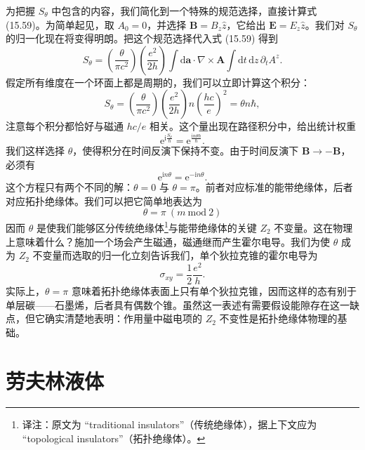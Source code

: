为把握 $S_{\theta}$ 中包含的内容，我们简化到一个特殊的规范选择，直接计算式 (15.59)。为简单起见，取 $A_{0}=0$，并选择 $\mathbf{B}=B_{z}\widehat{z}$，它给出 $\mathbf{E}=E_{z}\widehat{z}$。我们对 $S_{\theta}$ 的归一化现在将变得明朗。把这个规范选择代入式 (15.59) 得到
\begin{equation*}
S_{\theta}=\left(\frac{\theta}{\pi c^{2}}\right)\left(\frac{e^{2}}{2h}\right)\int\mathrm{d}\mathbf{a}\cdot\nabla\times\mathbf{A}\int\mathrm{d}t\,\mathrm{d}z\,\partial_{t}A^{z}.\tag{15.77}
\end{equation*}
假定所有维度在一个环面上都是周期的，我们可以立即计算这个积分：
\begin{equation*}
S_{\theta}=\left(\frac{\theta}{\pi c^{2}}\right)\left(\frac{e^{2}}{2h}\right)n\left(\frac{hc}{e}\right)^{2}=\theta n\hbar,\tag{15.78}
\end{equation*}
注意每个积分都恰好与磁通 $hc/e$ 相关。这个量出现在路径积分中，给出统计权重
\begin{equation*}
\mathrm{e}^{\mathrm{i}\frac{S_{\theta}}{\hbar}}=\mathrm{e}^{\frac{\mathrm{i}n\theta\hbar}{\hbar}}.\tag{15.79}
\end{equation*}
我们这样选择 $\theta$，使得积分在时间反演下保持不变。由于时间反演下 $\mathbf{B}\rightarrow-\mathbf{B}$，必须有
\begin{equation*}
\mathrm{e}^{\mathrm{i}n\theta}=\mathrm{e}^{-\mathrm{i}n\theta}.\tag{15.80}
\end{equation*}
这个方程只有两个不同的解：$\theta=0$ 与 $\theta=\pi$。前者对应标准的能带绝缘体，后者对应拓扑绝缘体。我们可以把它简单地表达为
\begin{equation*}
\theta=\pi\ (m\ \mathrm{mod}\ 2)\tag{15.81}
\end{equation*}
因而 $\theta$ 是使我们能够区分传统绝缘体\footnote{译注：原文为 ``traditional insulators''（传统绝缘体），据上下文应为 ``topological insulators''（拓扑绝缘体）。}与能带绝缘体的关键 $Z_{2}$ 不变量。这在物理上意味着什么？施加一个场会产生磁通，磁通继而产生霍尔电导。我们为使 $\theta$ 成为 $Z_{2}$ 不变量而选取的归一化立刻告诉我们，单个狄拉克锥的霍尔电导为
\begin{equation*}
\sigma_{xy}=\frac{1}{2}\frac{e^{2}}{h}.\tag{15.82}
\end{equation*}
实际上，$\theta=\pi$ 意味着拓扑绝缘体表面上只有单个狄拉克锥，因而这样的态有别于单层碳——石墨烯，后者具有偶数个锥。虽然这一表述有需要假设能隙存在这一缺点，但它确实清楚地表明：作用量中磁电项的 $Z_{2}$ 不变性是拓扑绝缘体物理的基础。

\section{劳夫林液体}

